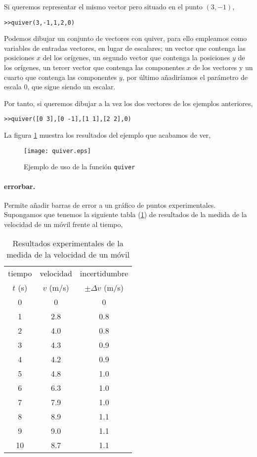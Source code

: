 Si queremos representar el mismo vector pero situado en el punto $(3,-1)$,
\begin{verbatim}
>>quiver(3,-1,1,2,0)
\end{verbatim}

Podemos dibujar un conjunto de vectores con quiver, para ello empleamos como variables de entradas vectores, en lugar de escalares; un vector que contenga las posiciones $x$ del los orígenes, un segundo vector que contenga la posiciones $y$ de los orígenes, un tercer vector que contenga las componentes $x$ de los vectores y un cuarto que contenga las componentes $y$, por último añadiríamos el parámetro de escala $0$, que sigue siendo un escalar.

Por tanto, si queremos dibujar a la vez los dos vectores de los ejemplos anteriores,

\begin{verbatim}
>>quiver([0 3],[0 -1],[1 1],[2 2],0)
\end{verbatim}

La figura \ref{fig:quiver} muestra los resultados del ejemplo que acabamos de ver,

\begin{figure}[h]
\centering
\texttt{[image: quiver.eps]}
\caption{Ejemplo de uso de la función \texttt{quiver}}
\label{fig:quiver}
\end{figure}

\paragraph{errorbar.} Permite añadir barras de  error a un gráfico de puntos experimentales. Supongamos que tenemos la siguiente tabla (\ref{vel}) de resultados de la medida de la velocidad de un móvil frente al tiempo,


\begin{table}[h]
\caption{Resultados experimentales de la medida de la velocidad de un móvil}
\centering
\begin{tabular}{ccc}
\hline
\hline
tiempo &velocidad& incertidumbre\\ 
$t$ (s)&$v$ (m/s)& $\pm \Delta v$ (m/s)\\
\hline
0&0&0\\
1&2.8&0.8\\
2&4.0&0.8\\
3&4.3&0.9\\
4&4.2&0.9\\
5&4.8&1.0\\
6&6.3&1.0\\
7&7.9&1.0\\
8&8.9&1.1\\
9&9.0&1.1\\
10&8.7&1.1\\
\hline
\hline
\end{tabular}
\label{vel}
\end{table} 

